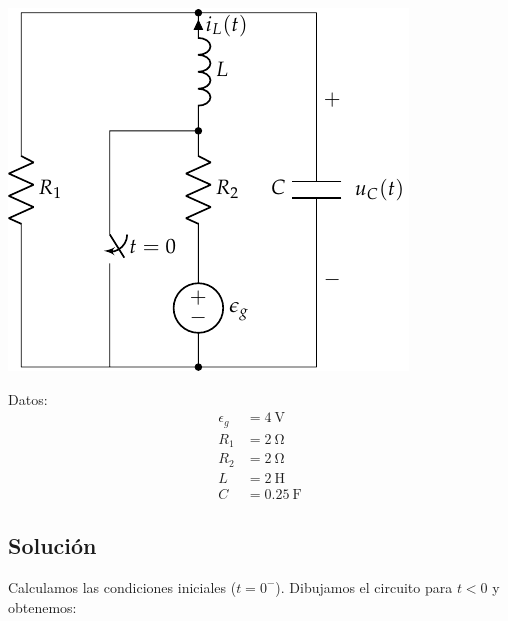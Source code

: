 \documentclass[12pt]{article}
\begin{document}
\begin{minipage}{0.7\textwidth}
  \includegraphics{figs/FM_4_9}
\end{minipage}
\hfill
\begin{minipage}{0.3\textwidth}
Datos:
\begin{align*}
  \epsilon_g &= \SI{4}{\volt}\\
  R_1 &= \SI{2}{\ohm}\\
  R_2 &= \SI{2}{\ohm}\\
  L &= \SI{2}{\henry}\\
  C &= \SI{0.25}{\farad}      
\end{align*}
\end{minipage}

\subsection*{Solución}

Calculamos las condiciones iniciales ($t = 0^-$). Dibujamos el circuito para $t < 0$ y obtenemos:

\bigskip
\end{document}
